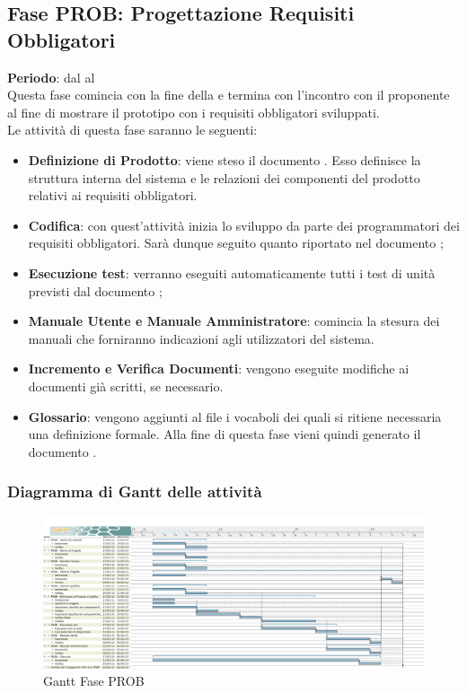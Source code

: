 \subsection{Fase PROB: Progettazione Requisiti Obbligatori}
	\textbf{Periodo}: dal  al  \\Questa fase comincia con la fine della  e termina con l'incontro con il proponente al fine di mostrare il prototipo con i requisiti obbligatori sviluppati.\\Le attività di questa fase saranno le seguenti:
	\begin{itemize}
		\item\textbf{Definizione di Prodotto}: viene steso il documento . Esso definisce la struttura interna del sistema e le relazioni dei componenti del prodotto relativi ai requisiti obbligatori.
		\item \textbf{Codifica}: con quest'attività inizia lo sviluppo da parte dei programmatori dei requisiti obbligatori. Sarà dunque seguito quanto riportato nel documento ;
		\item \textbf{Esecuzione test}: verranno eseguiti automaticamente tutti i test di unità previsti dal documento ;
		\item\textbf{Manuale Utente e Manuale Amministratore}: comincia la stesura dei manuali che forniranno indicazioni agli utilizzatori del sistema.
		\item\textbf{Incremento e Verifica Documenti}: vengono eseguite modifiche ai documenti già scritti, se necessario.
		\item\textbf{Glossario}: vengono aggiunti al file  i vocaboli dei quali si ritiene necessaria una definizione formale. Alla fine di questa fase vieni quindi generato il documento .
	\end{itemize}
	\subsubsection{Diagramma di Gantt delle attività}
	\begin{figure}[H]\centering
		\includegraphics[width=\textwidth]{PianoDiProgetto/Pics/FasePROB.png}
	\caption{Gantt Fase PROB}
\end{figure}
